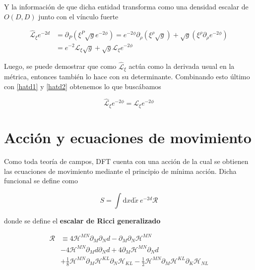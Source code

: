 \documentclass{article}
\numberwithin{equation}{section}
\begin{document}
Y la información de que dicha entidad transforma como una densidad escalar de $ O(D,D) $ junto con el vínculo fuerte

\begin{equation}\label{hatd2}
\begin{aligned}
\hat{\mathcal{L}}_{\xi} e^{-2d} &= \partial_P \left( \xi^P\sqrt{g}e^{-2\phi}\right) = e^{-2\phi} \partial_{\rho} \left(\xi^{\rho}\sqrt{g}\right) + \sqrt{g} \left(\xi^{\rho}\partial_{\rho}e^{-2\phi}\right)\\
&= e^{-2} \mathcal{L}_{\xi}\sqrt{g} + \sqrt{g} \mathcal{L}_{\xi}e^{-2\phi}
\end{aligned}
\end{equation}

Luego, se puede demostrar que como $ \hat{\mathcal{L}}_{\xi} $ actúa como la derivada usual en la métrica, entonces también lo hace con su determinante. Combinando esto último con \ref{hatd1} y \ref{hatd2} obtenemos lo que buscábamos

\begin{equation}\label{key}
\hat{\mathcal{L}}_{\xi} e^{-2\phi} = \mathcal{L}_{\xi} e^{-2\phi}
\end{equation}

\section{Acción y ecuaciones de movimiento}

Como toda teoría de campos, DFT cuenta con una acción de la cual se obtienen las ecuaciones de movimiento mediante el principio de mínima acción. Dicha funcional se define como

\begin{equation}\label{S}
S = \int \mathrm{d}x\mathrm{d}\widetilde{x} \ e^{-2d} \mathcal{R}
\end{equation}

donde se define el \textbf{escalar de Ricci generalizado}

\begin{equation}\label{Rhat}
\begin{aligned}
\mathcal{R} &\equiv 4\mathcal{H}^{MN}\partial_M\partial_N d - \partial_M\partial_N\mathcal{H}^{MN}\\
& - 4\mathcal{H}^{MN}\partial_M d\partial_N d + 4\partial_M\mathcal{H}^{MN}\partial_N d\\
& + \frac{1}{8} \mathcal{H}^{MN}\partial_M \mathcal{H}^{KL}\partial_N \mathcal{H}_{KL} - \frac{1}{2} \mathcal{H}^{MN}\partial_M \mathcal{H}^{KL}\partial_K \mathcal{H}_{NL}
\end{aligned}
\end{equation} 
\end{document}
